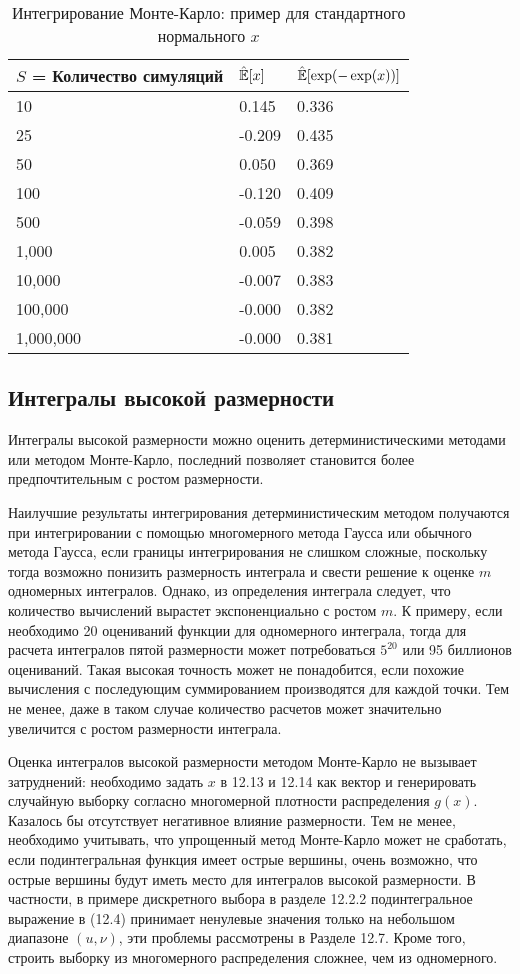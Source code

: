 \begin{table}[h]
\begin{center}
\caption{\label{tab:pred} Интегрирование Монте-Карло: пример для стандартного нормального $x$}
\begin{tabular}{lll}
\hline
\hline
$S$ = Количество симуляций & $\hat{\mathbb{E}}[x]$ & $\hat{\mathbb{E}}[\exp(-\exp(x))]$ \\ 
\hline 
10 & 0.145 & 0.336 \\ 
25 & -0.209 & 0.435 \\ 
50 & 0.050 & 0.369 \\ 
100 & -0.120 & 0.409 \\ 
500 & -0.059 & 0.398 \\ 
1,000 & 0.005 & 0.382 \\ 
10,000 & -0.007 & 0.383 \\ 
100,000 & -0.000 & 0.382 \\ 
1,000,000 & -0.000 & 0.381 \\ 
\hline 
\end{tabular}
\end{center}
\end{table} 

\subsection{Интегралы высокой размерности}

Интегралы высокой размерности можно оценить детерминистическими методами или методом Монте-Карло, последний позволяет становится более предпочтительным с ростом размерности.

Наилучшие результаты интегрирования детерминистическим методом получаются при интегрировании с помощью многомерного метода Гаусса или обычного метода Гаусса, если границы интегрирования не слишком сложные, поскольку тогда возможно понизить размерность интеграла и свести решение к оценке $m$ одномерных интегралов. Однако, из определения интеграла следует, что количество вычислений вырастет экспоненциально с ростом $m$. К примеру, если необходимо 20 оцениваний функции для одномерного интеграла, тогда для расчета интегралов пятой размерности может потребоваться $5^{20}$ или 95 биллионов оцениваний. Такая высокая точность может не понадобится, если похожие вычисления  с последующим суммированием производятся для каждой точки. Тем не менее, даже в таком случае количество расчетов может значительно увеличится с ростом размерности интеграла.

Оценка интегралов высокой размерности методом Монте-Карло не вызывает затруднений: необходимо задать $x$ в 12.13 и 12.14 как вектор и генерировать случайную выборку согласно многомерной плотности распределения $g(x)$. Казалось бы отсутствует негативное влияние размерности. 
Тем не менее, необходимо учитывать, что упрощенный метод Монте-Карло может не сработать, если подинтегральная функция имеет острые вершины, очень возможно, что острые вершины будут иметь место для интегралов высокой размерности. 
В частности, в примере дискретного выбора в разделе 12.2.2 подинтегральное выражение в (12.4) принимает ненулевые значения  только на небольшом диапазоне $(u,\nu)$, эти проблемы рассмотрены в Разделе 12.7. Кроме того, строить выборку из многомерного распределения сложнее, чем из одномерного. 

